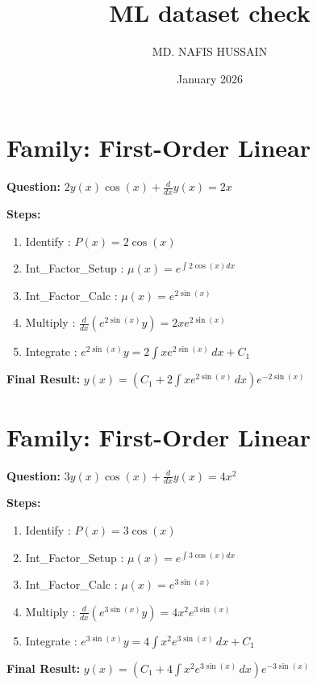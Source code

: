 \documentclass{article}
\title{ML dataset check}
\author{MD. NAFIS HUSSAIN}
\date{January 2026}
\begin{document}
\maketitle
\section*{Family: First-Order Linear}
\textbf{Question:} $2 y{\left(x \right)} \cos{\left(x \right)} + \frac{d}{d x} y{\left(x \right)} = 2 x$

\textbf{Steps:}
\begin{enumerate}
\item Identify :  $P(x) = 2 \cos{\left(x \right)}$
\item Int_Factor_Setup :  $\mu(x) = e^{\int 2 \cos{\left(x \right)} dx}$
\item Int_Factor_Calc :  $\mu(x) = e^{2 \sin{\left(x \right)}}$
\item Multiply :  $\frac{d}{dx}(e^{2 \sin{\left(x \right)}}y) = 2 x e^{2 \sin{\left(x \right)}}$
\item Integrate :  $e^{2 \sin{\left(x \right)}}y = 2 \int x e^{2 \sin{\left(x \right)}}\, dx + C_1$
\end{enumerate}
\textbf{Final Result:} $y{\left(x \right)} = \left(C_{1} + 2 \int x e^{2 \sin{\left(x \right)}}\, dx\right) e^{- 2 \sin{\left(x \right)}}$

\section*{Family: First-Order Linear}
\textbf{Question:} $3 y{\left(x \right)} \cos{\left(x \right)} + \frac{d}{d x} y{\left(x \right)} = 4 x^{2}$

\textbf{Steps:}
\begin{enumerate}
\item Identify :  $P(x) = 3 \cos{\left(x \right)}$
\item Int_Factor_Setup :  $\mu(x) = e^{\int 3 \cos{\left(x \right)} dx}$
\item Int_Factor_Calc :  $\mu(x) = e^{3 \sin{\left(x \right)}}$
\item Multiply :  $\frac{d}{dx}(e^{3 \sin{\left(x \right)}}y) = 4 x^{2} e^{3 \sin{\left(x \right)}}$
\item Integrate :  $e^{3 \sin{\left(x \right)}}y = 4 \int x^{2} e^{3 \sin{\left(x \right)}}\, dx + C_1$
\end{enumerate}
\textbf{Final Result:} $y{\left(x \right)} = \left(C_{1} + 4 \int x^{2} e^{3 \sin{\left(x \right)}}\, dx\right) e^{- 3 \sin{\left(x \right)}}$
\end{document}

